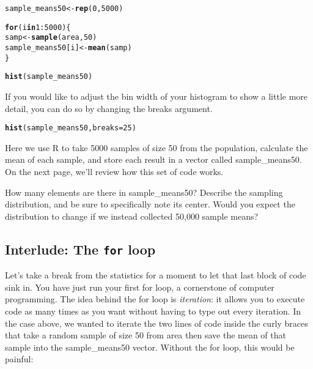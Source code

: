 \documentclass{article}\usepackage[]{graphicx}\usepackage[]{color}
\makeatletter
\newcommand{\hlnum}[1]{\textcolor[rgb]{0.686,0.059,0.569}{#1}}%
\newcommand{\hlopt}[1]{\textcolor[rgb]{0,0,0}{#1}}%
\newcommand{\hlstd}[1]{\textcolor[rgb]{0.345,0.345,0.345}{#1}}%
\newcommand{\hlkwa}[1]{\textcolor[rgb]{0.161,0.373,0.58}{\textbf{#1}}}%
\newcommand{\hlkwb}[1]{\textcolor[rgb]{0.69,0.353,0.396}{#1}}%
\newcommand{\hlkwc}[1]{\textcolor[rgb]{0.333,0.667,0.333}{#1}}%
\newcommand{\hlkwd}[1]{\textcolor[rgb]{0.737,0.353,0.396}{\textbf{#1}}}%
\newenvironment{kframe}{%
 \def\at@end@of@kframe{}%
 \ifinner\ifhmode%
  \def\at@end@of@kframe{\end{minipage}}%
  \begin{minipage}{\columnwidth}%
 \fi\fi%
 \def\FrameCommand##1{\hskip\@totalleftmargin \hskip-\fboxsep
 \colorbox{shadecolor}{##1}\hskip-\fboxsep
     \hskip-\linewidth \hskip-\@totalleftmargin \hskip\columnwidth}%
 \MakeFramed {\advance\hsize-\width
   \@totalleftmargin\z@ \linewidth\hsize
   \@setminipage}}%
 {\par\unskip\endMakeFramed%
 \at@end@of@kframe}
\newenvironment{knitrout}{}{} %
\makeatother
\begin{document}
\begin{knitrout}
\color{fgcolor}\begin{kframe}
\begin{alltt}
\hlstd{sample_means50} \hlkwb{<-} \hlkwd{rep}\hlstd{(}\hlnum{0}\hlstd{,} \hlnum{5000}\hlstd{)}

\hlkwa{for} \hlstd{(i} \hlkwa{in} \hlnum{1}\hlopt{:}\hlnum{5000}\hlstd{) \{}
    \hlstd{samp} \hlkwb{<-} \hlkwd{sample}\hlstd{(area,} \hlnum{50}\hlstd{)}
    \hlstd{sample_means50[i]} \hlkwb{<-} \hlkwd{mean}\hlstd{(samp)}
\hlstd{\}}

\hlkwd{hist}\hlstd{(sample_means50)}
\end{alltt}
\end{kframe}
\end{knitrout}


If you would like to adjust the bin width of your histogram to show a little more detail, you can do so by changing the \hlkwc{breaks} argument.

\begin{knitrout}
\color{fgcolor}\begin{kframe}
\begin{alltt}
\hlkwd{hist}\hlstd{(sample_means50,} \hlkwc{breaks} \hlstd{=} \hlnum{25}\hlstd{)}
\end{alltt}
\end{kframe}
\end{knitrout}


Here we use R to take 5000 samples of size 50 from the population, calculate the mean of each sample, and store each result in a vector called \hlstd{sample\_means50}. On the next page, we'll review how this set of code works.

\begin{exercise}
How many elements are there in \hlstd{sample\_means50}?  Describe the sampling distribution, and be sure to specifically note its center.  Would you expect the distribution to change if we instead collected 50,000 sample means?
\end{exercise}

\subsection*{Interlude: The \texttt{for} loop}
Let's take a break from the statistics for a moment to let that last block of code sink in.  You have just run your first for loop, a cornerstone of computer programming.  The idea behind the for loop is \emph{iteration}: it allows you to execute code as many times as you want without having to type out every iteration.  In the case above, we wanted to iterate the two lines of code inside the curly braces that take a random sample of size 50 from \hlstd{area} then save the mean of that sample into the \hlstd{sample\_means50} vector.  Without the for loop, this would be painful:
\end{document}
